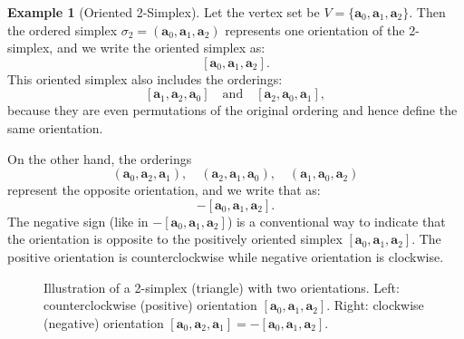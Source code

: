 \documentclass[12pt,oneside,reqno]{amsart}
\theoremstyle{plain}
\theoremstyle{definition}
\newtheorem{example}{Example}[section]
\theoremstyle{remark}
\newcommand{\0}{{\textbf{0}}}
\begin{document}
\begin{example}[Oriented 2-Simplex]\label{eg:Oriented 2-Simplex}
Let the vertex set be $V = \{\mathbf{a}_0, \mathbf{a}_1, \mathbf{a}_2\}$. Then the ordered simplex $\sigma_2 = (\mathbf{a}_0, \mathbf{a}_1, \mathbf{a}_2)$ represents one orientation of the 2-simplex, and we write the oriented simplex as:  
\[
[\mathbf{a}_0, \mathbf{a}_1, \mathbf{a}_2].
\]
This oriented simplex also includes the orderings:
\[
[\mathbf{a}_1, \mathbf{a}_2, \mathbf{a}_0] \quad \text{and} \quad [\mathbf{a}_2, \mathbf{a}_0, \mathbf{a}_1],
\]
because they are even permutations of the original ordering and hence define the same orientation.

On the other hand, the orderings
\[
(\mathbf{a}_0, \mathbf{a}_2, \mathbf{a}_1), \quad (\mathbf{a}_2, \mathbf{a}_1, \mathbf{a}_0), \quad (\mathbf{a}_1, \mathbf{a}_0, \mathbf{a}_2)
\]
represent the opposite orientation, and we write that as:
\[
-[\mathbf{a}_0, \mathbf{a}_1, \mathbf{a}_2].
\]
The negative sign (like in $-[\mathbf{a}_0, \mathbf{a}_1, \mathbf{a}_2]$) is a conventional way to indicate that the orientation is opposite to the positively oriented simplex $[\mathbf{a}_0, \mathbf{a}_1, \mathbf{a}_2]$. The positive orientation is counterclockwise while negative orientation is clockwise. 
\begin{figure}[h!]
\centering
{}
\caption{Illustration of a 2-simplex (triangle) with two orientations. Left: counterclockwise (positive) orientation $[\mathbf{a}_0, \mathbf{a}_1, \mathbf{a}_2]$. Right: clockwise (negative) orientation $[\mathbf{a}_0, \mathbf{a}_2, \mathbf{a}_1] = -[\mathbf{a}_0, \mathbf{a}_1, \mathbf{a}_2]$.}
\label{fig:oriented-2-simplex}
\end{figure}
\end{example}
\end{document}
